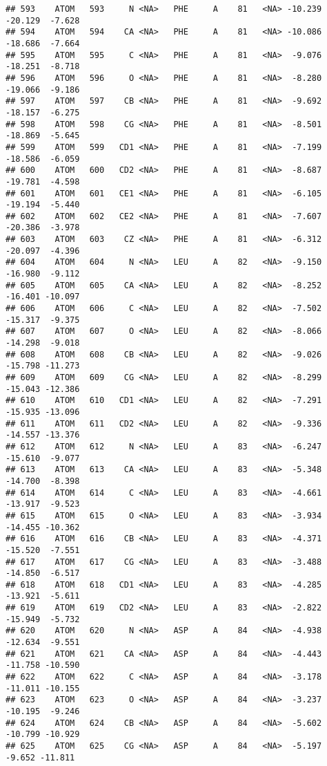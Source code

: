 \documentclass[
]{article}
\begin{document}
\begin{verbatim}
## 593    ATOM   593     N <NA>   PHE     A    81   <NA> -10.239 -20.129  -7.628
## 594    ATOM   594    CA <NA>   PHE     A    81   <NA> -10.086 -18.686  -7.664
## 595    ATOM   595     C <NA>   PHE     A    81   <NA>  -9.076 -18.251  -8.718
## 596    ATOM   596     O <NA>   PHE     A    81   <NA>  -8.280 -19.066  -9.186
## 597    ATOM   597    CB <NA>   PHE     A    81   <NA>  -9.692 -18.157  -6.275
## 598    ATOM   598    CG <NA>   PHE     A    81   <NA>  -8.501 -18.869  -5.645
## 599    ATOM   599   CD1 <NA>   PHE     A    81   <NA>  -7.199 -18.586  -6.059
## 600    ATOM   600   CD2 <NA>   PHE     A    81   <NA>  -8.687 -19.781  -4.598
## 601    ATOM   601   CE1 <NA>   PHE     A    81   <NA>  -6.105 -19.194  -5.440
## 602    ATOM   602   CE2 <NA>   PHE     A    81   <NA>  -7.607 -20.386  -3.978
## 603    ATOM   603    CZ <NA>   PHE     A    81   <NA>  -6.312 -20.097  -4.396
## 604    ATOM   604     N <NA>   LEU     A    82   <NA>  -9.150 -16.980  -9.112
## 605    ATOM   605    CA <NA>   LEU     A    82   <NA>  -8.252 -16.401 -10.097
## 606    ATOM   606     C <NA>   LEU     A    82   <NA>  -7.502 -15.317  -9.375
## 607    ATOM   607     O <NA>   LEU     A    82   <NA>  -8.066 -14.298  -9.018
## 608    ATOM   608    CB <NA>   LEU     A    82   <NA>  -9.026 -15.798 -11.273
## 609    ATOM   609    CG <NA>   LEU     A    82   <NA>  -8.299 -15.043 -12.386
## 610    ATOM   610   CD1 <NA>   LEU     A    82   <NA>  -7.291 -15.935 -13.096
## 611    ATOM   611   CD2 <NA>   LEU     A    82   <NA>  -9.336 -14.557 -13.376
## 612    ATOM   612     N <NA>   LEU     A    83   <NA>  -6.247 -15.610  -9.077
## 613    ATOM   613    CA <NA>   LEU     A    83   <NA>  -5.348 -14.700  -8.398
## 614    ATOM   614     C <NA>   LEU     A    83   <NA>  -4.661 -13.917  -9.523
## 615    ATOM   615     O <NA>   LEU     A    83   <NA>  -3.934 -14.455 -10.362
## 616    ATOM   616    CB <NA>   LEU     A    83   <NA>  -4.371 -15.520  -7.551
## 617    ATOM   617    CG <NA>   LEU     A    83   <NA>  -3.488 -14.850  -6.517
## 618    ATOM   618   CD1 <NA>   LEU     A    83   <NA>  -4.285 -13.921  -5.611
## 619    ATOM   619   CD2 <NA>   LEU     A    83   <NA>  -2.822 -15.949  -5.732
## 620    ATOM   620     N <NA>   ASP     A    84   <NA>  -4.938 -12.634  -9.551
## 621    ATOM   621    CA <NA>   ASP     A    84   <NA>  -4.443 -11.758 -10.590
## 622    ATOM   622     C <NA>   ASP     A    84   <NA>  -3.178 -11.011 -10.155
## 623    ATOM   623     O <NA>   ASP     A    84   <NA>  -3.237 -10.195  -9.246
## 624    ATOM   624    CB <NA>   ASP     A    84   <NA>  -5.602 -10.799 -10.929
## 625    ATOM   625    CG <NA>   ASP     A    84   <NA>  -5.197  -9.652 -11.811

\end{verbatim}
\end{document}
